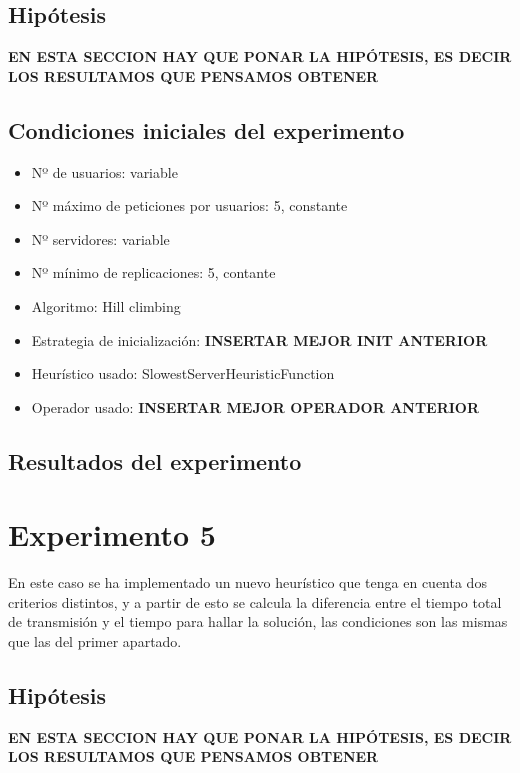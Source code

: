 \documentclass[a4paper,10pt]{report}
\begin{document}
		
		\section*{Hipótesis}
		\textbf{EN ESTA SECCION HAY QUE PONAR LA HIPÓTESIS, ES DECIR LOS RESULTAMOS QUE PENSAMOS OBTENER}
		
		\section*{Condiciones iniciales del experimento}
		\begin{itemize}
		    \item Nº de usuarios: variable
    		\item Nº máximo de peticiones por usuarios: 5, constante
    		\item Nº servidores: variable
    		\item Nº mínimo de replicaciones: 5, contante 
    		\item Algoritmo: Hill climbing
    		\item Estrategia de inicialización: \textbf{INSERTAR MEJOR INIT ANTERIOR}
    		\item Heurístico usado: SlowestServerHeuristicFunction
    		\item Operador usado: \textbf{INSERTAR MEJOR OPERADOR ANTERIOR}
		\end{itemize}

		\section*{Resultados del experimento}
		
		
	\chapter*{Experimento 5}

		En este caso se ha implementado un nuevo heurístico que tenga en cuenta dos criterios distintos, y a partir de esto se calcula la diferencia entre el tiempo total de transmisión y el tiempo para hallar la solución, las condiciones son las mismas que las del primer apartado.\newline

        \section*{Hipótesis}
		\textbf{EN ESTA SECCION HAY QUE PONAR LA HIPÓTESIS, ES DECIR LOS RESULTAMOS QUE PENSAMOS OBTENER}
\end{document}
